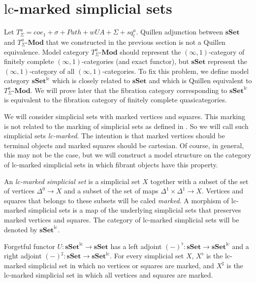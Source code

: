 \documentclass[reqno]{amsart}
\theoremstyle{definition}
\theoremstyle{remark}
\newcommand{\cat}[1]{\mathbf{#1}}
\newcommand{\Mod}[1]{#1\text{-}\cat{Mod}}
\newcommand{\sSet}{\cat{sSet}}
\newcommand{\lc}{lc}
\newcommand{\mlc}{\mathrm{\lc}}
\newcommand{\lcsSet}{\sSet^\mlc}
\numberwithin{figure}{section}
\begin{document}
\section{$\mlc$-marked simplicial sets}

Let $T^a_\Sigma = coe_1 + \sigma + Path + wUA + \Sigma + sq^a_l$.
Quillen adjunction between $\sSet$ and $\Mod{T^a_\Sigma}$ that we constructed in the previous section is not a Quillen equivalence.
Model category $\Mod{T^a_\Sigma}$ should represent the $(\infty,1)$-category of finitely complete $(\infty,1)$-categories (and exact functor),
but $\sSet$ represent the $(\infty,1)$-category of all $(\infty,1)$-categories.
To fix this problem, we define model category $\lcsSet$ which is closely related to $\sSet$ and which is Quillen equivalent to $\Mod{T^a_\Sigma}$.
We will prove later that the fibration category corresponding to $\lcsSet$ is equivalent to the fibration category of finitely complete quasicategories.

We will consider simplicial sets with marked vertices and squares.
This marking is not related to the marking of simplicial sets as defined in \cite{lurie-topos}.
So we will call such simplicial sets \emph{\lc-marked}.
The intention is that marked vertices should be terminal objects and marked squares should be cartesian.
Of course, in general, this may not be the case, but we will construct a model structure on
the category of \lc-marked simplicial sets in which fibrant objects have this property.

\begin{defn}
An \emph{\lc-marked simplicial set} is a simplicial set $X$ together with a subset of the set of vertices $\Delta^0 \to X$
and a subset of the set of maps $\Delta^1 \times \Delta^1 \to X$.
Vertices and squares that belongs to these subsets will be caled \emph{marked}.
A morphism of \lc-marked simplicial sets is a map of the underlying simplicial sets that preserves marked vertices and squares.
The category of \lc-marked simplicial sets will be denoted by $\lcsSet$.
\end{defn}

Forgetful functor $U : \lcsSet \to \sSet$ has a left adjoint $(-)^\flat : \sSet \to \lcsSet$ and a right adjoint $(-)^\sharp : \sSet \to \lcsSet$.
For every simplicial set $X$, $X^\flat$ is the \lc-marked simplicial set in which no vertices or squares are marked,
and $X^\sharp$ is the \lc-marked simplicial set in which all vertices and squares are marked.
\end{document}
